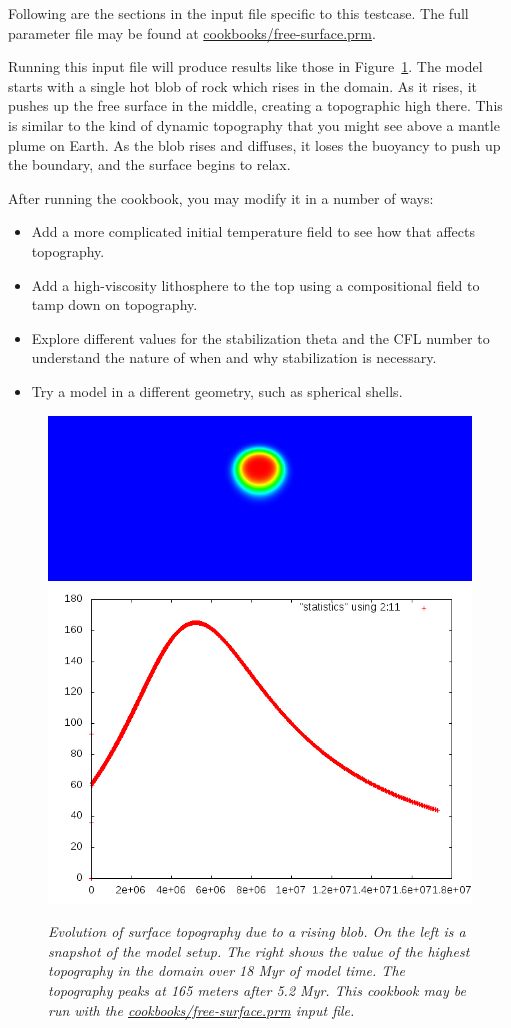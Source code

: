 \documentclass{article}
\begin{document}
Following are the sections in the input file specific to this testcase.  The full parameter
file may be found at \url{cookbooks/free-surface.prm}.



Running this input file will produce results like those in Figure~\ref{fig:freesurface}.
The model starts with a single hot blob of rock which rises in the domain.  As it 
rises, it pushes up the free surface in the middle, creating a topographic high there.
This is similar to the kind of dynamic topography that you might see above a mantle 
plume on Earth.  As the blob rises and diffuses, it loses the buoyancy to push up 
the boundary, and the surface begins to relax.

After running the cookbook, you may modify it in a number of ways:
\begin{itemize}
\item Add a more complicated initial temperature field to see how that affects topography.
\item Add a high-viscosity lithosphere to the top using a compositional field to tamp down on topography.
\item Explore different values for the stabilization theta and the CFL number to understand the nature of when and why stabilization is necessary.
\item Try a model in a different geometry, such as spherical shells.
\end{itemize}

\begin{figure}
  \centering
  \includegraphics[height=0.25\textwidth]{cookbooks/free_surface/free_surface_blob.png}
  \hfill
  \includegraphics[height=0.25\textwidth]{cookbooks/free_surface/free_surface_topography.png}
  \caption{\it Evolution of surface topography due to a rising blob.  On the left is a 
           snapshot of the model setup.  The right shows the value of the highest 
           topography in the domain over 18 Myr of model time.  The topography peaks
           at 165 meters after 5.2 Myr.  This cookbook may be run with the
           \url{cookbooks/free-surface.prm} input file.}
  \label{fig:freesurface}
\end{figure}
\end{document}
